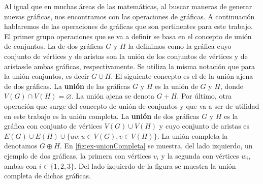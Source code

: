 Al igual que en muchas \'areas de las matem\'aticas, al buscar maneras de
generar nuevas gr\'aficas, nos encontramos con las operaciones de gr\'aficas. A
continuaci\'on hablaremos de las operaciones de gr\'aficas que son pertinentes
para este trabajo. El primer grupo operaciones que se va a definir se basa en el
concepto de uni\'on de conjuntos. La  de dos gr\'aficas $G$ y
$H$ la definimos como la gr\'afica cuyo conjunto de v\'ertices y de aristas son
la uni\'on de los conjuntos de v\'ertices  y de aristasde ambas gr\'aficas,
respectivamente. Se utiliza la misma notaci\'on que para la uni\'on conjuntos,
es decir $G \cup H$. El siguiente concepto es el de la uni\'on ajena de dos
gr\'aficas. La \textbf{uni\'on}  de las gr\'aficas $G$
y $H$ es la uni\'on de $G$ y $H$, donde $V(G) \cap V(H) = \varnothing$. La
uni\'on ajena se denota $G + H$. Por \'ultimo, otra operaci\'on que surge del
concepto de uni\'on de conjuntos y que va a ser de utilidad en este trabajo es
la uni\'on completa. La \textbf{uni\'on}  de dos
gr\'aficas $G$ y $H$ es la gr\'afica con conjunto de v\'ertices $V(G) \cup V(H)$
y cuyo conjunto de aristas es $E(G) \cup E(H) \cup \{uv \colon u \in V(G), v \in
V(H) \}$. La uni\'on completa la denotamos $G \oplus H$. En \cref{fig:ex-unionCompleta} se muestra, del lado izquierdo, un
ejemplo de dos gr\'aficas, la primera con v\'ertices $v_i$ y la segunda con
v\'ertices $w_i$, ambas con $i \in \{1, 2 ,3\}$. Del lado izquierdo de la figura
se muestra la uni\'on completa de dichas gr\'aficas.

